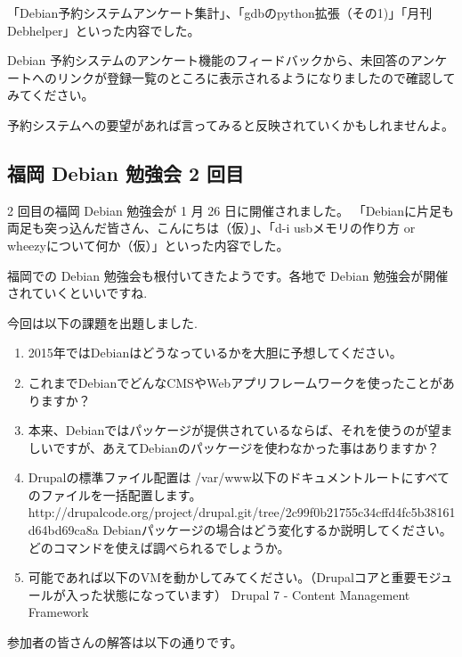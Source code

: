 \documentclass[mingoth,a4paper]{jsarticle}
\begin{document}
「Debian予約システムアンケート集計」、「gdbのpython拡張（その1)」「月刊Debhelper」といった内容でした。

Debian 予約システムのアンケート機能のフィードバックから、未回答のアンケートへのリンクが登録一覧のところに表示されるようになりましたので確認してみてください。

予約システムへの要望があれば言ってみると反映されていくかもしれませんよ。


\subsection{福岡 Debian 勉強会 2 回目}
2 回目の福岡 Debian 勉強会が 1 月 26 日に開催されました。
「Debianに片足も両足も突っ込んだ皆さん、こんにちは（仮）」、「d-i usbメモリの作り方 or wheezyについて何か（仮）」といった内容でした。

福岡での Debian 勉強会も根付いてきたようです。各地で Debian 勉強会が開催されていくといいですね.



今回は以下の課題を出題しました.
\begin{screen}
  \begin{enumerate}
  \item 2015年ではDebianはどうなっているかを大胆に予想してください。
  \item これまでDebianでどんなCMSやWebアプリフレームワークを使ったことがありますか？
  \item 本来、Debianではパッケージが提供されているならば、それを使うのが望ましいですが、あえてDebianのパッケージを使わなかった事はありますか？
  \item Drupalの標準ファイル配置は /var/www以下のドキュメントルートにすべてのファイルを一括配置します。
    http://drupalcode.org/project/drupal.git/tree/2c99f0b21755c34cffd4fc5b38161d64bd69ca8a
    Debianパッケージの場合はどう変化するか説明してください。
    どのコマンドを使えば調べられるでしょうか。
  \item 可能であれば以下のVMを動かしてみてください。（Drupalコアと重要モジュールが入った状態になっています）
    Drupal 7 - Content Management Framework
  \end{enumerate}
\end{screen}

参加者の皆さんの解答は以下の通りです。
\end{document}
